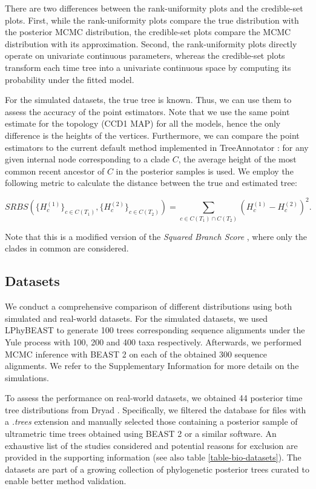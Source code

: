 \documentclass[10pt,letterpaper]{article}
\begin{document}
There are two differences between the rank-uniformity plots and the credible-set plots. First, while the rank-uniformity plots compare the true distribution with the posterior MCMC distribution, the credible-set plots compare the MCMC distribution with its approximation. Second, the rank-uniformity plots directly operate on univariate continuous parameters, whereas the credible-set plots transform each time tree into a univariate continuous space by computing its probability under the fitted model.

For the simulated datasets, the true tree is known. Thus, we can use them to assess the accuracy of the point estimators. Note that we use the same point estimate for the topology (CCD1 MAP) for all the models, hence the only difference is the heights of the vertices. Furthermore, we can compare the point estimators to the current default method implemented in TreeAnnotator \cite{treeannotator}: for any given internal node corresponding to a clade $C$, the average height of the most common recent ancestor of $C$ in the posterior samples is used. We employ the following metric to calculate the distance between the true and estimated tree:

$$
SRBS\left(\{H^{(1)}_c\}_{c \in C(T_1)}, \{H^{(2)}_c\}_{c \in C(T_2)}\right) = \sum_{c \in C(T_1) \cap C(T_2)} \left(H^{(1)}_c-H^{(2)}_c\right)^2 .
$$

Note that this is a modified version of the \emph{Squared Branch Score} \cite{treesinforest}, where only the clades in common are considered.



\subsection*{Datasets}

We conduct a comprehensive comparison of different distributions using both simulated and real-world datasets. For the simulated datasets, we used LPhyBEAST \cite{linguaphylo} to generate 100 trees corresponding sequence alignments under the Yule process with 100, 200 and 400 taxa respectively. Afterwards, we performed MCMC inference with BEAST 2 \cite{beast2} on each of the obtained 300 sequence alignments. We refer to the Supplementary Information for more details on the simulations.

To assess the performance on real-world datasets, we obtained 44 posterior time tree distributions from Dryad \cite{dryad}. Specifically, we filtered the database for files with a \emph{.trees} extension and manually selected those containing a posterior sample of ultrametric time trees obtained using BEAST 2 or a similar software. An exhaustive list of the studies considered and potential reasons for exclusion are provided in the supporting information (see also table \ref{table-bio-datasets}). The datasets are part of a growing collection of phylogenetic posterior trees \cite{tree_dataset} curated to enable better method validation.
\end{document}

